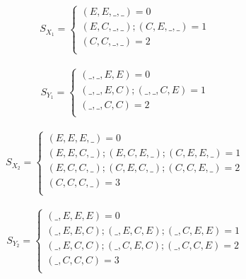 \documentclass[12pt,a4paper,draft]{article}
\begin{document}
	\vspace{0.5cm}
	\[
	S_{X_{1}} =
	\begin{cases}
		(E, E, \_, \_) = 0\\
		(E, C, \_, \_); (C, E, \_, \_) = 1\\
		(C, C, \_, \_) = 2\\
	\end{cases}
	\]
	\vspace{0.5cm}\\
	\[
	S_{Y_{1}} =
	\begin{cases}
		(\_, \_, E, E) = 0\\
		(\_, \_, E, C); (\_, \_, C, E) = 1\\
		(\_, \_, C, C) = 2\\
	\end{cases}
	\]
	\vspace{0.5cm}\\
	\[
	S_{X_{2}} =
	\begin{cases}
		(E, E, E, \_) = 0\\
		(E, E, C, \_); (E, C, E, \_); (C, E, E, \_) = 1\\
		(E, C, C, \_); (C, E, C, \_); (C, C, E, \_) = 2\\
		(C, C, C, \_) = 3\\
	\end{cases}
	\]
	\vspace{0.5cm}\\
	\[
	S_{Y_{2}} =
	\begin{cases}
		(\_, E, E, E) = 0\\
		(\_, E, E, C); (\_, E, C, E); (\_, C, E, E) = 1\\
		(\_, E, C, C); (\_, C, E, C); (\_, C, C, E) = 2\\
		(\_, C, C, C) = 3\\
	\end{cases}
	\]
	\vspace{1cm}
\end{document}
